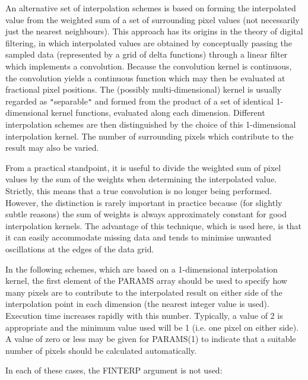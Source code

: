 \documentclass[twoside,11pt]{article}
\begin{document}
{{{      }
      An alternative set of interpolation schemes is based on forming
      the interpolated value from the weighted sum of a set of
      surrounding pixel values (not necessarily just the nearest
      neighbours). This approach has its origins in the theory of
      digital filtering, in which interpolated values are obtained by
      conceptually passing the sampled data (represented by a grid of
      delta functions) through a linear filter which implements a
      convolution. Because the convolution kernel is continuous, the
      convolution yields a continuous function which may then be
      evaluated at fractional pixel positions. The (possibly
      multi-dimensional) kernel is usually regarded as {\tt{"}}separable{\tt{"}} and
      formed from the product of a set of identical 1-dimensional
      kernel functions, evaluated along each dimension. Different
      interpolation schemes are then distinguished by the choice of
      this 1-dimensional interpolation kernel. The number of
      surrounding pixels which contribute to the result may also be
      varied.

      From a practical standpoint, it is useful to divide the weighted
      sum of pixel values by the sum of the weights when determining
      the interpolated value.  Strictly, this means that a true
      convolution is no longer being performed. However, the
      distinction is rarely important in practice because (for
      slightly subtle reasons) the sum of weights is always
      approximately constant for good interpolation kernels. The
      advantage of this technique, which is used here, is that it can
      easily accommodate missing data and tends to minimise unwanted
      oscillations at the edges of the data grid.

      In the following schemes, which are based on a 1-dimensional
      interpolation kernel, the first element of the PARAMS array
      should be used to specify how many pixels are to contribute to the
      interpolated result on either side of the interpolation point in
      each dimension (the nearest integer value is used). Execution time
      increases rapidly with this number. Typically, a value of 2 is
      appropriate and the minimum value used will be 1 (i.e. one pixel on
      either side). A value of zero or less may be given for PARAMS(1)
      to indicate that a suitable number of pixels should be calculated
      automatically.

      In each of these cases, the FINTERP argument is not used:

}}
\end{document}
